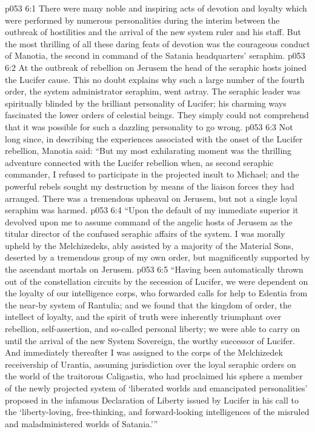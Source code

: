 \vs p053 6:1 There were many noble and inspiring acts of devotion and loyalty which were performed by numerous personalities during the interim between the outbreak of hostilities and the arrival of the new system ruler and his staff. But the most thrilling of all these daring feats of devotion was the courageous conduct of Manotia, the second in command of the Satania headquarters’ seraphim.
\vs p053 6:2 At the outbreak of rebellion on Jerusem the head of the seraphic hosts joined the Lucifer cause. This no doubt explains why such a large number of the fourth order, the system administrator seraphim, went astray. The seraphic leader was spiritually blinded by the brilliant personality of Lucifer; his charming ways fascinated the lower orders of celestial beings. They simply could not comprehend that it was possible for such a dazzling personality to go wrong.
\vs p053 6:3 \pc Not long since, in describing the experiences associated with the onset of the Lucifer rebellion, Manotia said: “But my most exhilarating moment was the thrilling adventure connected with the Lucifer rebellion when, as second seraphic commander, I refused to participate in the projected insult to Michael; and the powerful rebels sought my destruction by means of the liaison forces they had arranged. There was a tremendous upheaval on Jerusem, but not a single loyal seraphim was harmed.
\vs p053 6:4 “Upon the default of my immediate superior it devolved upon me to assume command of the angelic hosts of Jerusem as the titular director of the confused seraphic affairs of the system. I was morally upheld by the Melchizedeks, ably assisted by a majority of the Material Sons, deserted by a tremendous group of my own order, but magnificently supported by the ascendant mortals on Jerusem.
\vs p053 6:5 “Having been automatically thrown out of the constellation circuits by the secession of Lucifer, we were dependent on the loyalty of our intelligence corps, who forwarded calls for help to Edentia from the near\hyp{}by system of Rantulia; and we found that the kingdom of order, the intellect of loyalty, and the spirit of truth were inherently triumphant over rebellion, self\hyp{}assertion, and so\hyp{}called personal liberty; we were able to carry on until the arrival of the new System Sovereign, the worthy successor of Lucifer. And immediately thereafter I was assigned to the corps of the Melchizedek receivership of Urantia, assuming jurisdiction over the loyal seraphic orders on the world of the traitorous Caligastia, who had proclaimed his sphere a member of the newly projected system of ‘liberated worlds and emancipated personalities’ proposed in the infamous Declaration of Liberty issued by Lucifer in his call to the ‘liberty\hyp{}loving, free\hyp{}thinking, and forward\hyp{}looking intelligences of the misruled and maladministered worlds of Satania.’”
